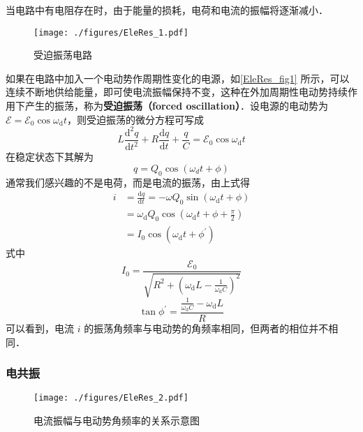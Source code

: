 

当电路中有电阻存在时，由于能量的损耗，电荷和电流的振幅将逐渐减小．
\begin{figure}[ht]
\centering
\texttt{[image: ./figures/EleRes\_1.pdf]}
\caption{受迫振荡电路} \label{EleRes_fig1}
\end{figure}
如果在电路中加入一个电动势作周期性变化的电源，如\autoref{EleRes_fig1} 所示，可以连续不断地供给能量，即可使电流振幅保持不变，这种在外加周期性电动势持续作用下产生的振荡，称为\textbf{受迫振荡（forced oscillation）}．设电源的电动势为 $\mathscr{E}=\mathscr{E}_{0} \cos \omega_{\mathrm{d}} t$，则受迫振荡的微分方程可写成
\begin{equation}
L \frac{\mathrm{d}^{2} q}{\mathrm{d} t^{2}}+R \frac{\mathrm{d} q}{\mathrm{d} t}+\frac{q}{C}=\mathscr{E}_{0} \cos \omega_{\mathrm{d}} t
\end{equation}
在稳定状态下其解为
\begin{equation}
q=Q_{0} \cos \left(\omega_{d} t+\phi\right)
\end{equation}
通常我们感兴趣的不是电荷，而是电流的振荡，由上式得
\begin{equation}
\begin{aligned}i&=\frac{\mathrm{d} q}{\mathrm{d} t}=-\omega Q_{0} \sin \left(\omega_{\mathrm{d}} t+\phi\right) \\ &=\omega_{\mathrm{d}} Q_{0} \cos \left(\omega_{\mathrm{d}} t+\phi+\frac{\pi}{2}\right) \\ &=I_{0} \cos \left(\omega_{\mathrm{d}} t+\phi^{\prime}\right)\end{aligned}
\end{equation}
式中
\begin{equation} \label{EleRes_eq1}
I_{0}=\frac{\mathscr{E}_{0}}{\sqrt{R^{2}+\left(\omega_{\mathrm{d}} L-\frac{1}{\omega_{\mathrm{d}} C}\right)^{2}}}
\end{equation}
\begin{equation} \label{EleRes_eq2}
\tan \phi^{\prime}=\frac{\frac{1}{\omega_{\mathrm{d}} C}-\omega_{\mathrm{d}} L}{R}
\end{equation}
可以看到，电流 $i$ 的振荡角频率与电动势的角频率相同，但两者的相位并不相同．

\subsubsection{电共振}
\begin{figure}[ht]
\centering
\texttt{[image: ./figures/EleRes\_2.pdf]}
\caption{电流振幅与电动势角频率的关系示意图} \label{EleRes_fig2}
\end{figure}

